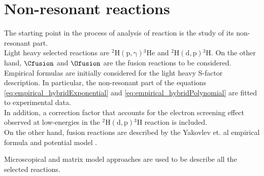 \documentclass[openany]{book}
\begin{document}
\section{Non-resonant reactions} \label{sec:nonResonant}

The starting point in the process of analysis of reaction is the study of its non-resonant part. \\

Light heavy selected reactions are $\mathrm{{}^{2}{H} (p, \gamma) {}^{3}{He}} $ and $\mathrm{{}^{2}{H}(d,p){}^{3}{H}} $. On the other hand,  $\Cfusion$  and $\Ofusion$ are the fusion reactions to be considered. \\

Empirical formulas are initially considered for the light heavy S-factor description. In particular, the non-resonant part of the equations \ref{eq:empirical_hybridExponential}  and \ref{eq:empirical_hybridPolynomial} are fitted to experimental data.  \\

In addition, a correction factor that accounts for the electron screening effect observed at low-energies  in the $\mathrm{{}^{2}H(d, p){}^{3}H}$ reaction is included. \\
 
On the other hand, fusion reactions are described by the Yakovlev et. al empirical formula \cite{beard_afanasjev_chamon_gasques_wiescher_yakovlev_2010} and potential model  \cite{yakovlev_beard_gasques_wiescher_2010}. 

Microscopical and matrix model approaches are  used to be describe all the selected reactions.




 
\end{document}
